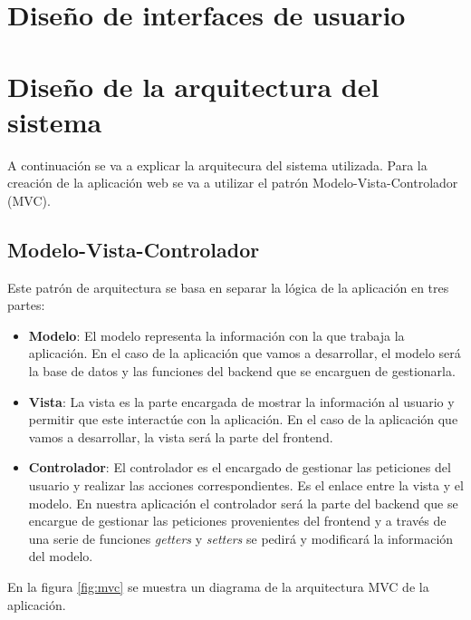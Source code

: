 \section{Diseño de interfaces de usuario}

\section{Diseño de la arquitectura del sistema}
A continuación se va a explicar la arquitecura del sistema utilizada.
Para la creación de la aplicación web se va a utilizar el patrón
Modelo-Vista-Controlador (MVC).

\subsection{Modelo-Vista-Controlador}
Este patrón de arquitectura se basa en separar la lógica de la aplicación
en tres partes:

\begin{itemize}
    \item \textbf{Modelo}: El modelo representa la información con la que trabaja
    la aplicación. En el caso de la aplicación que vamos a desarrollar, el modelo
    será la base de datos y las funciones del backend que se encarguen de gestionarla.
    \item \textbf{Vista}: La vista es la parte encargada de mostrar la información
    al usuario y permitir que este interactúe con la aplicación. En el caso de la
    aplicación que vamos a desarrollar, la vista será la parte del frontend.
    \item \textbf{Controlador}: El controlador es el encargado de gestionar las
    peticiones del usuario y realizar las acciones correspondientes. Es el enlace
    entre la vista y el modelo. En nuestra aplicación el controlador será la parte
    del backend que se encargue de gestionar las peticiones provenientes del frontend
    y a través de una serie de funciones \textit{getters} y \textit{setters} se
    pedirá y modificará la información del modelo.
\end{itemize}

En la figura \ref{fig:mvc} se muestra un diagrama de la arquitectura MVC de la
aplicación.

